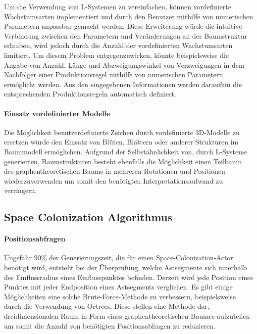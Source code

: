 Um die Verwendung von L-Systemen zu vereinfachen, können vordefinierte Wachstumsarten implementiert und durch den Benutzer mithilfe von numerischen Parametern anpassbar gemacht werden. Diese Erweiterung würde die intuitive Verbindung zwischen den Parametern und Veränderungen an der Baumstruktur erlauben, wird jedoch durch die Anzahl der vordefinierten Wachstumsarten limitiert. Um diesem Problem entgegenzuwirken, könnte beispielsweise die Angabe von Anzahl, Länge und Abzweigungswinkel von Verzweigungen in dem Nachfolger einer Produktionsregel mithilfe von numerischen Parametern ermöglicht werden. Aus den eingegebenen Informationen werden daraufhin die entsprechenden Produktionsregeln automatisch definiert.

\paragraph{Einsatz vordefinierter Modelle}

Die Möglichkeit benutzerdefinierte Zeichen durch vordefinierte 3D-Modelle zu ersetzen würde den Einsatz von Blüten, Blättern oder anderer Strukturen im Baummodell ermöglichen. Aufgrund der Selbstähnlichkeit von, durch L-Systeme generierten, Baumstrukturen besteht ebenfalls die Möglichkeit einen Teilbaum des graphentheoretischen Baums in mehreren Rotationen und Positionen wiederzuverwenden um somit den benötigten Interpretationsaufwand zu verringern. \cite[S.82]{Deussen:05}

\subsection{Space Colonization Algorithmus}

\paragraph{Positionsabfragen}

Ungefähr $90\%$ der Generierungszeit, die für einen Space-Colonization-Actor benötigt wird, entsteht bei der Überprüfung, welche Astsegmente sich innerhalb des Einflussradius eines Einflusspunktes befinden. Derzeit wird jede Position eines Punktes mit jeder Endposition eines Astsegments verglichen. Es gibt einige Möglichkeiten eine solche Brute-Force-Methode zu verbessern, beispielsweise durch die Verwendung von Octrees. Diese stellen eine Methode dar, dreidimensionalen Raum in Form eines graphentheoretischen Baumes aufzuteilen um somit die Anzahl von benötigten Positionsabfragen zu reduzieren. \cite[S.1]{Octree:10}

